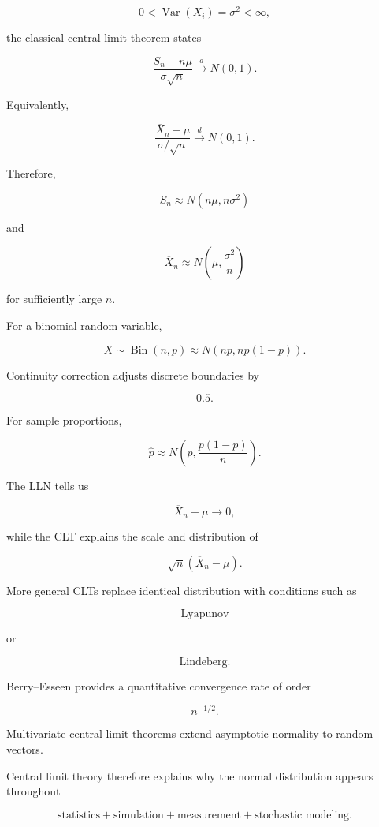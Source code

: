 \[
0<
\operatorname{Var}(X_i)
=
\sigma^2
<
\infty,
\]

the classical central limit theorem states

\[
\boxed{
\frac{
S_n-n\mu
}{
\sigma\sqrt{n}
}
\xrightarrow{d}
N(0,1).
}
\]

Equivalently,

\[
\boxed{
\frac{
\overline{X}_n-\mu
}{
\sigma/\sqrt{n}
}
\xrightarrow{d}
N(0,1).
}
\]

Therefore,

\[
\boxed{
S_n
\approx
N(n\mu,n\sigma^2)
}
\]

and

\[
\boxed{
\overline{X}_n
\approx
N
\left(
\mu,
\frac{\sigma^2}{n}
\right)
}
\]

for sufficiently large \(n\).

For a binomial random variable,

\[
\boxed{
X
\sim
\operatorname{Bin}(n,p)
\approx
N
\left(
np,
np(1-p)
\right).
}
\]

Continuity correction adjusts discrete boundaries by

\[
\boxed{
0.5.
}
\]

For sample proportions,

\[
\boxed{
\widehat{p}
\approx
N
\left(
p,
\frac{
p(1-p)
}{n}
\right).
}
\]

The LLN tells us

\[
\boxed{
\overline{X}_n-\mu
\to0,
}
\]

while the CLT explains the scale and distribution of

\[
\boxed{
\sqrt{n}
(\overline{X}_n-\mu).
}
\]

More general CLTs replace identical distribution with conditions such as

\[
\boxed{
\text{Lyapunov}
}
\]

or

\[
\boxed{
\text{Lindeberg}.
}
\]

Berry--Esseen provides a quantitative convergence rate of order

\[
\boxed{
n^{-1/2}.
}
\]

Multivariate central limit theorems extend asymptotic normality to random
vectors.

Central limit theory therefore explains why the normal distribution
appears throughout

\[
\boxed{
\text{statistics}
+
\text{simulation}
+
\text{measurement}
+
\text{stochastic modeling}.
}
\]

